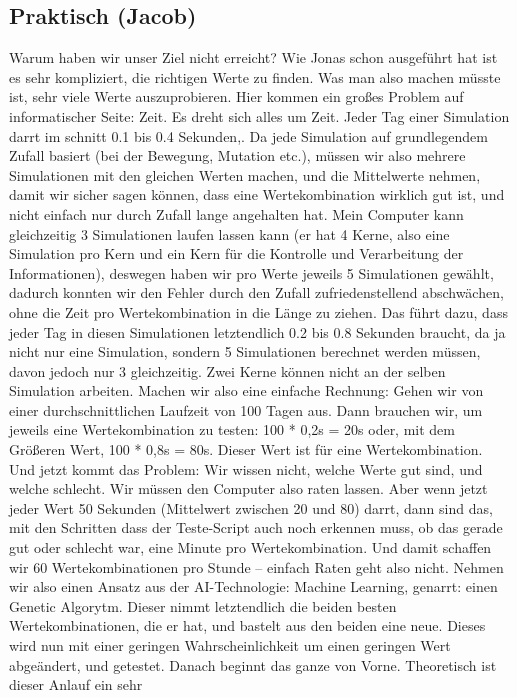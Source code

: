 \documentclass[12pt]{article}
\begin{document}
\subsection{Praktisch (Jacob)}
Warum haben wir unser Ziel nicht erreicht? Wie Jonas schon ausgeführt hat ist es sehr
kompliziert, die richtigen Werte zu finden. Was man also machen müsste ist, sehr viele
Werte auszuprobieren. Hier kommen ein großes Problem auf informatischer Seite:
Zeit. Es dreht sich alles um Zeit. Jeder Tag einer Simulation darrt im schnitt 0.1 bis 0.4
Sekunden,. Da jede Simulation auf grundlegendem Zufall basiert (bei der Bewegung, Mutation etc.), müssen wir also mehrere Simulationen mit den gleichen Werten machen, und die Mittelwerte nehmen, damit wir sicher sagen können, dass eine Wertekombination wirklich gut ist, und nicht
einfach nur durch Zufall lange angehalten hat. Mein Computer kann gleichzeitig 3 Simulationen laufen lassen kann (er hat 4 Kerne, also eine Simulation pro Kern und ein
Kern für die Kontrolle und Verarbeitung der Informationen), deswegen haben wir pro
Werte jeweils 5 Simulationen gewählt, dadurch konnten wir den Fehler durch den Zufall
zufriedenstellend abschwächen, ohne die Zeit pro Wertekombination in die Länge zu ziehen.
Das führt dazu, dass jeder Tag in diesen Simulationen letztendlich 0.2 bis 0.8 Sekunden
braucht, da ja nicht nur eine Simulation, sondern 5 Simulationen berechnet werden
müssen, davon jedoch nur 3 gleichzeitig. Zwei Kerne können nicht an der selben
Simulation arbeiten.
Machen wir also eine einfache Rechnung: Gehen wir von einer durchschnittlichen
Laufzeit von 100 Tagen aus. Dann brauchen wir, um jeweils eine Wertekombination zu
testen: 100 * 0,2s = 20s oder, mit dem Größeren Wert, 100 * 0,8s = 80s. Dieser Wert ist
für eine Wertekombination. Und jetzt kommt das Problem: Wir wissen nicht, welche Werte gut
sind, und welche schlecht. Wir müssen den Computer also raten lassen. Aber wenn jetzt
jeder Wert 50 Sekunden (Mittelwert zwischen 20 und 80) darrt, dann sind das, mit den
Schritten dass der Teste-Script auch noch erkennen muss, ob das gerade gut oder
schlecht war, eine Minute pro Wertekombination. Und damit schaffen wir 60
Wertekombinationen pro Stunde – einfach Raten geht also nicht.
Nehmen wir also einen Ansatz aus der AI-Technologie: Machine Learning, genarrt:
einen Genetic Algorytm. Dieser nimmt letztendlich die beiden besten
Wertekombinationen, die er hat, und bastelt aus den beiden eine neue. Dieses
wird nun mit einer geringen Wahrscheinlichkeit um einen geringen Wert abgeändert, und
getestet. Danach beginnt das ganze von Vorne. Theoretisch ist dieser Anlauf ein sehr
\end{document}
